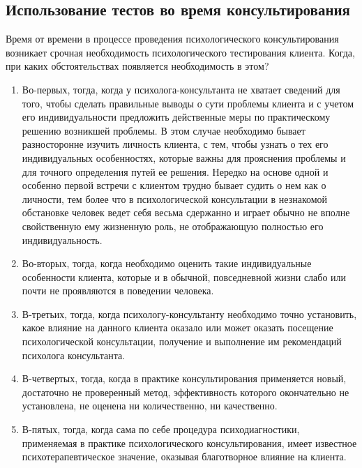 \documentclass[a4paper, 12pt]{report}
\begin{document}
    \subsection*{Использование тестов во время консультирования}
    Время от времени в процессе проведения психологического 
    консультирования возникает срочная необходимость психологического 
    тестирования клиента. Когда, при каких обстоятельствах появляется 
    необходимость в этом?
    \begin{enumerate}

        \item Во-первых, тогда, когда у психолога-консультанта не хватает сведений для того, чтобы сделать правильные выводы о сути проблемы клиента и с учетом его индивидуальности предложить действенные меры по практическому решению возникшей проблемы. В этом случае необходимо бывает разносторонне изучить личность клиента, с тем, чтобы узнать о тех его индивидуальных особенностях, которые важны для прояснения проблемы и для точного определения путей ее решения.
        Нередко на основе одной и особенно первой встречи с клиентом 
        трудно бывает судить о нем как о личности, тем более что в 
        психологической консультации в незнакомой обстановке человек 
        ведет себя весьма сдержанно и играет обычно не вполне свойственную 
        ему жизненную роль, не отображающую полностью его индивидуальность.
        
        \item Во-вторых, тогда, когда необходимо оценить такие индивидуальные 
        особенности клиента, которые и в обычной, повседневной жизни слабо 
        или почти не проявляются в поведении человека.
                  
        \item В-третьих, тогда, когда психологу-консультанту необходимо 
        точно установить, какое влияние на данного клиента оказало или 
        может оказать посещение психологической консультации, получение 
        и выполнение им рекомендаций психолога консультанта.
                    
        \item В-четвертых, тогда, когда в практике консультирования 
        применяется новый, достаточно не проверенный метод, эффективность 
        которого окончательно не установлена, не оценена ни количественно, 
        ни качественно.
                
        \item В-пятых, тогда, когда сама по себе процедура 
        психодиагностики, применяемая в практике психологического 
        консультирования, имеет известное психотерапевтическое значение, 
        оказывая благотворное влияние на клиента.
                  
        \end{enumerate}
\end{document}
